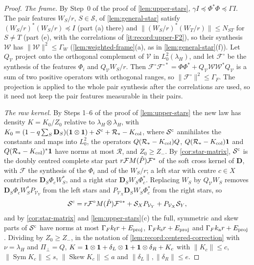 \begin{proof}
\emph{The frame.} By Step~0 of the proof of \cref{lem:upper-stars},
$\gamma I\preceq\Phi^*\Phi\preceq\Gamma I$. The pair features $W_S/r$,
$S\in\mathcal S$, of \cref{lem:general-star} satisfy $(W_S/r)^*(W_S/r)\preceq I$
(part (a) there) and $\|(W_S/r)^*(W_T/r)\|\le N_{ST}$ for $S\ne T$ (part (e), with
the correlations of \ref{it:record:upper-F2}), so their synthesis $\mathcal W$
has $\|\mathcal W\|^2\le\Gamma_W$ (\cref{lem:weighted-frame}(a), as in
\cref{lem:general-star}(f)). Let $Q_{\mathcal V}$ project onto the orthogonal
complement of $\mathcal V$ in $L^2_0(\lambda_H)$, and let $\mathcal F^\circ$ be the
synthesis of the features $\Phi_i$ and $Q_{\mathcal V}W_S/r$. Then
$\mathcal F^\circ\mathcal F^{\circ*}=\Phi\Phi^*+Q_{\mathcal V}\mathcal W\mathcal W^*Q_{\mathcal V}$
is a sum of two positive operators with orthogonal ranges, so
$\|\mathcal F^\circ\|^2\le\Gamma_F$. The projection is applied to the whole pair
synthesis after the correlations are used, so it need not keep the pair
features measurable in their pairs.

\emph{The raw kernel.} By Steps 1--6 of the proof of \cref{lem:upper-stars} the
new law has density $K=K_0/Z_0$ relative to $\lambda_H\otimes\lambda_H$, with
$K_0=(1-q\sum_S\mathbf D_S)(\mathbf 1\otimes\mathbf 1)+\mathcal S^{\rm c}+\mathcal R_*-K_{\rm col}$,
where $\mathcal S^{\rm c}$ annihilates the constants and maps into $L^2_0$, the
operators $Q(\mathcal R_*-K_{\rm col})Q$, $Q(\mathcal R_*-K_{\rm col})\mathbf 1$ and
$Q(\mathcal R_*-K_{\rm col})^*\mathbf 1$ have norms at most $\mathcal R$, and
$Z_0\ge Z_-$. By \cref{cor:star-matrix}, $\mathcal S^{\rm c}$ is the doubly
centred complete star part $r\mathcal FM(\hat P)\mathcal F^*$ of the soft cross
kernel of $\mathbf D$, with $\mathcal F$ the synthesis of the $\Phi_i$ and of the
$W_S/r$; a left star with centre $c\in X$ contributes $\mathbf D_S\Phi_cW_S^*$, and
a right star $\mathbf D_SW_S\Phi_c^*$. Replacing $W_S$ by $Q_{\mathcal V}W_S$
removes $\mathbf D_S\Phi_cW_S^*P_{\mathcal V_Y}$ from the left stars and
$P_{\mathcal V_X}\mathbf D_SW_S\Phi_c^*$ from the right stars, so
\[
 \mathcal S^{\rm c}=r\mathcal F^\circ M(\hat P)\mathcal F^{\circ*}
 +\mathcal S_XP_{\mathcal V_Y}+P_{\mathcal V_X}\mathcal S_Y ,
\]
and by \cref{cor:star-matrix} and \cref{lem:upper-stars}(c) the full, symmetric
and skew parts of $\mathcal S^{\rm c}$ have norms at most
$\Gamma_Fk_{\rm f}r+E_{\rm proj}$, $\Gamma_Fk_{\rm s}r+E_{\rm proj}$ and
$\Gamma_Fk_{\rm a}r+E_{\rm proj}$. Dividing by $Z_0\ge Z_-$, in the notation of
\cref{lem:record:centered-correction} with $\nu=\lambda_H$ and $\Pi_\perp=Q$,
$K=\mathbf 1\otimes\mathbf 1+\delta_L\otimes\mathbf 1+\mathbf 1\otimes\delta_R+K_c$ with
$\|K_c\|\le c$, $\|\operatorname{Sym}K_c\|\le s$, $\|\operatorname{Skew}K_c\|\le a$
and $\|\delta_L\|,\|\delta_R\|\le e$.


\end{proof}
